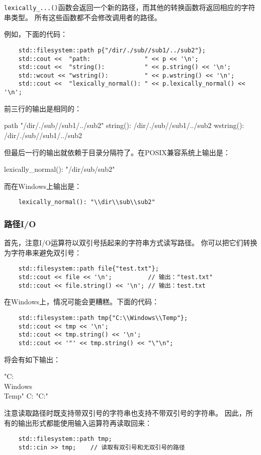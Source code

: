 \texttt{lexically\_...()}函数会返回一个新的路径，而其他的转换函数将返回相应的字符串类型。
所有这些函数都不会修改调用者的路径。

例如，下面的代码：
\begin{lstlisting}
    std::filesystem::path p{"/dir/./sub//sub1/../sub2"};
    std::cout <<  "path:               " << p << '\n';
    std::cout <<  "string():           " << p.string() << '\n';
    std::wcout << "wstring():          " << p.wstring() << '\n';
    std::cout <<  "lexically_normal(): " << p.lexically_normal() << '\n';
\end{lstlisting}
前三行的输出是相同的：
\begin{blacklisting}
    path                "/dir/./sub//sub1/../sub2"
    string():           /dir/./sub//sub1/../sub2
    wstring():          /dir/./sub//sub1/../sub2
\end{blacklisting}
但最后一行的输出就依赖于目录分隔符了。在POSIX兼容系统上输出是：
\begin{blacklisting}
    lexically_normal(): "/dir/sub/sub2"
\end{blacklisting}
而在Windows上输出是：
\begin{lstlisting}
    lexically_normal(): "\\dir\\sub\\sub2"
\end{lstlisting}

\subsubsection{路径I/O}
首先，注意I/O运算符以双引号括起来的字符串方式读写路径。
你可以把它们转换为字符串来避免双引号：
\begin{lstlisting}
    std::filesystem::path file{"test.txt"};
    std::cout << file << '\n';          // 输出："test.txt"
    std::cout << file.string() << '\n'; // 输出：test.txt
\end{lstlisting}
在Windows上，情况可能会更糟糕。下面的代码：
\begin{lstlisting}
    std::filesystem::path tmp{"C:\\Windows\\Temp"};
    std::cout << tmp << '\n';
    std::cout << tmp.string() << '\n';
    std::cout << '"' << tmp.string() << "\"\n";
\end{lstlisting}
将会有如下输出：
\begin{blacklisting}
    "C:\\Windows\\Temp"
    C:\Windows\Temp
    "C:\Windows\Temp"
\end{blacklisting}
注意读取路径时既支持带双引号的字符串也支持不带双引号的字符串。
因此，所有的输出形式都能使用输入运算符再读取回来：
\begin{lstlisting}
    std::filesystem::path tmp;
    std::cin >> tmp;    // 读取有双引号和无双引号的路径
\end{lstlisting}


